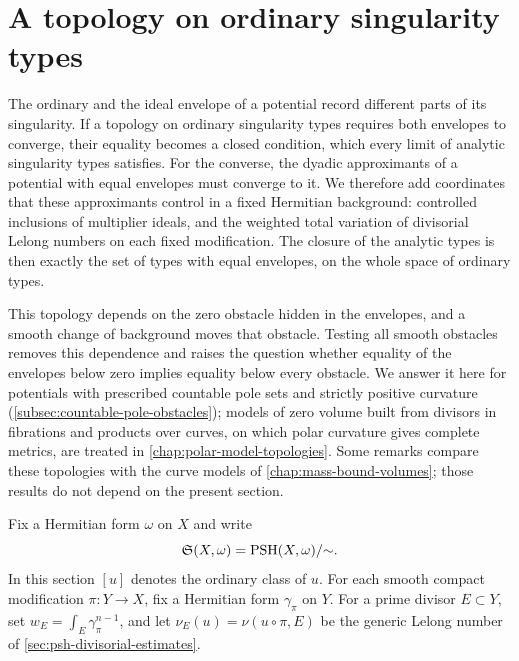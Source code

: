 \section{A topology on ordinary singularity types}
\label{sec:ordinary-type-topology}

The ordinary and the ideal envelope of a potential record different parts of its singularity. If a topology on ordinary singularity types requires both envelopes to converge, their equality becomes a closed condition, which every limit of analytic singularity types satisfies. For the converse, the dyadic approximants of a potential with equal envelopes must converge to it. We therefore add coordinates that these approximants control in a fixed Hermitian background: controlled inclusions of multiplier ideals, and the weighted total variation of divisorial Lelong numbers on each fixed modification. The closure of the analytic types is then exactly the set of types with equal envelopes, on the whole space of ordinary types.

This topology depends on the zero obstacle hidden in the envelopes, and a smooth change of background moves that obstacle. Testing all smooth obstacles removes this dependence and raises the question whether equality of the envelopes below zero implies equality below every obstacle. We answer it here for potentials with prescribed countable pole sets and strictly positive curvature (\cref{subsec:countable-pole-obstacles}); models of zero volume built from divisors in fibrations and products over curves, on which polar curvature gives complete metrics, are treated in \cref{chap:polar-model-topologies}. Some remarks compare these topologies with the curve models of \cref{chap:mass-bound-volumes}; those results do not depend on the present section.

Fix a Hermitian form $\omega$ on $X$ and write
\[
 \mathfrak S(X,\omega)=\mathrm{PSH}(X,\omega)/{\sim}.
\]
In this section $[u]$ denotes the ordinary class of $u$. For each smooth compact modification $\pi\colon Y\to X$, fix a Hermitian form $\gamma_\pi$ on $Y$. For a prime divisor $E\subset Y$, set $w_E=\int_E\gamma_\pi^{n-1}$, and let $\nu_E(u)=\nu(u\circ\pi,E)$ be the generic Lelong number of \cref{sec:psh-divisorial-estimates}.

